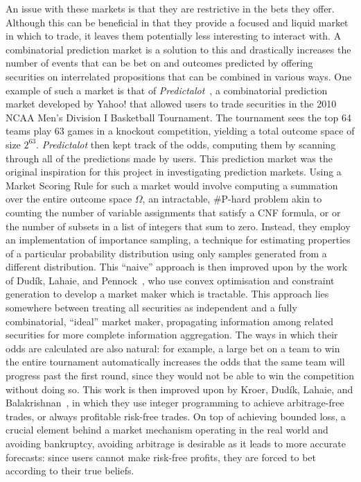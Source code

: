An issue with these markets is that they are restrictive in the bets they
offer. Although this can be beneficial in that they provide a focused and
liquid market in which to trade, it leaves them potentially less interesting to
interact with. A combinatorial prediction market is a solution to this and
drastically increases the number of events that can be bet on and outcomes
predicted by offering securities on interrelated propositions that can be
combined in various ways. One example of such a market is that of
\emph{Predictalot}~\cite{Predictalot}, a combinatorial prediction market
developed by Yahoo! that allowed users to trade securities in the 2010 NCAA
Men's Division I Basketball Tournament. The tournament sees the top 64 teams
play 63 games in a knockout competition, yielding a total outcome space of size
$2^{63}$. \emph{Predictalot} then kept track of the odds, computing them by
scanning through all of the predictions made by users. This prediction market
was the original inspiration for this project in investigating prediction
markets. Using a Market Scoring Rule for such a market would involve computing
a summation over the entire outcome space $\Omega$, an intractable, \#P-hard
problem akin to counting the number of variable assignments that satisfy a CNF
formula, or or the number of subsets in a list of integers that sum to zero.
Instead, they employ an implementation of importance sampling, a technique for
estimating properties of a particular probability distribution using only
samples generated from a different distribution. This ``naive'' approach is
then improved upon by the work of Dud\'ik, Lahaie, and
Pennock~\cite{Dudik2012}, who use convex optimisation and constraint generation
to develop a market maker which is tractable. This approach lies somewhere
between treating all securities as independent and a fully combinatorial,
``ideal'' market maker, propagating information among related securities for
more complete information aggregation. The ways in which their odds are
calculated are also natural: for example, a large bet on a team to win the
entire tournament automatically increases the odds that the same team will
progress past the first round, since they would not be able to win the
competition without doing so. This work is then improved upon by Kroer,
Dud\'ik, Lahaie, and Balakrishnan~\cite{Kroer2016}, in which they use integer
programming to achieve arbitrage-free trades, or always profitable risk-free
trades. On top of achieving bounded loss, a crucial element behind a market
mechanism operating in the real world and avoiding bankruptcy, avoiding
arbitrage is desirable as it leads to more accurate forecasts: since users
cannot make risk-free profits, they are forced to bet according to their true
beliefs.

